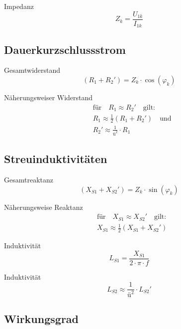 \documentclass[11pt, a4paper, draft, fleqn, twocolumn]{article}
\numberwithin{equation}{subsection}
\begin{document}
\noindent Impedanz
\begin{equation}
    Z_k = \frac{U_{1k}}{I_{1k}}
\end{equation}


\subsection{Dauerkurzschlussstrom}

Gesamtwiderstand
\begin{equation}
    (R_1 + R_2') = Z_k \cdot \cos(\varphi_k)
\end{equation}

\noindent Näherungsweiser Widerstand
\begin{equation}
\begin{split}
    & \text{für} \quad R_1 \approx R_2' \quad \text{gilt:} \\
    & R_1 \approx \frac{1}{2}(R_1 + R_2') \quad \text{und} \\
    & R_2' \approx \frac{1}{\text{ü}^2}\cdot R_1
\end{split}
\end{equation}


\subsection{Streuinduktivitäten}

Gesamtreaktanz
\begin{equation}
    (X_{S1} + X_{S2}') = Z_k \cdot \sin(\varphi_k)
\end{equation}

\noindent Näherungsweise Reaktanz
\begin{equation}
\begin{split}
    & \text{für} \quad X_{S1} \approx X_{S2}' \quad \text{gilt:} \\
    & X_{S1} \approx \frac{1}{2}(X_{S1} + X_{S2}')
\end{split}
\end{equation}

\noindent Induktivität
\begin{equation}
    L_{S1} = \frac{X_{S1}}{2 \cdot \pi \cdot f}
\end{equation}

\noindent Induktivität
\begin{equation}
    L_{S2} \approx \frac{1}{\text{ü}^2} \cdot L_{S2}'
\end{equation}


\subsection{Wirkungsgrad}
\end{document}
